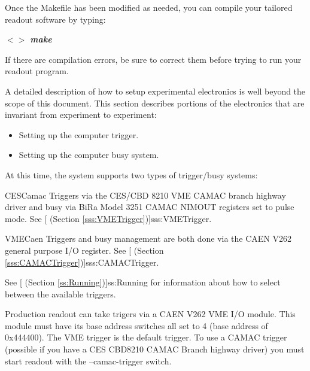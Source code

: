 	Once the Makefile has been modified as needed, you can compile your 
   tailored readout software by typing:
   \begin{example}
   \it{ $<>$ } \bf{make}
   \end{example}
   
   If there are compilation errors, be sure to correct them before trying
   to run your readout program.

   A detailed description of how to setup experimental electronics
   is well beyond the scope of this document.  This section describes
   portions of the electronics that are invariant from experiment to experiment:
   \begin{itemize}
      \item Setting up the computer trigger.
      \item Setting up the computer busy system.
   \end{itemize}
   
   At this time, the system supports two types of trigger/busy 
   systems:
   \begin{description}
      \item{CESCamac} Triggers via the CES/CBD 8210 VME CAMAC
	 branch highway driver and busy via BiRa Model 3251 CAMAC NIMOUT
	 registers set to pulse mode. See [
	  (Section \ref{sss:VMETrigger})]{sss:VMETrigger}.
      \item{VMECaen}  Triggers and busy management are both done via
	 the CAEN V262 general purpose I/O register. See
	 [
	 (Section \ref{sss:CAMACTrigger})]{sss:CAMACTrigger}.
   \end{description}
   
   See [
      (Section \ref{ss:Running})]{ss:Running} for information
      about how to select between the available triggers.
      
	Production readout can take trigers via a CAEN V262 VME I/O module.
	This module must have its base address switches all set to 4 (base
	address of  0x444400).  The VME trigger is the default trigger.  To use
	a CAMAC trigger (possible if you have a CES CBD8210 CAMAC Branch
	highway driver) you must start readout with the --camac-trigger switch.

